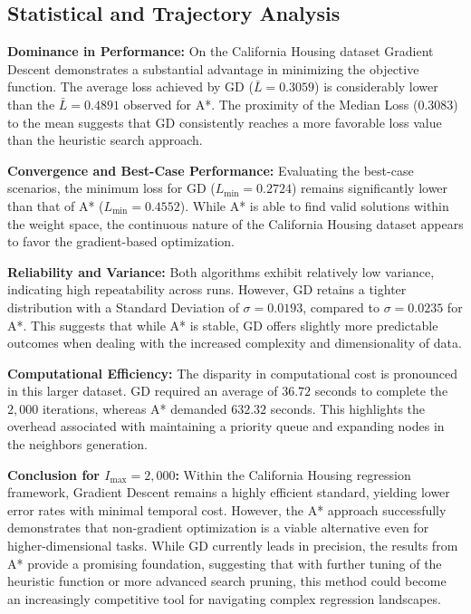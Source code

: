 \subsection*{Statistical and Trajectory Analysis}

\noindent \textbf{Dominance in Performance:} On the California Housing dataset Gradient Descent demonstrates a substantial advantage in minimizing the objective function. The average loss achieved by GD ($\bar{L} = 0.3059$) is considerably lower than the $\bar{L} = 0.4891$ observed for A*. The proximity of the Median Loss ($0.3083$) to the mean suggests that GD consistently reaches a more favorable loss value than the heuristic search approach.

\noindent \textbf{Convergence and Best-Case Performance:} Evaluating the best-case scenarios, the minimum loss for GD ($L_{\min} = 0.2724$) remains significantly lower than that of A* ($L_{\min} = 0.4552$). While A* is able to find valid solutions within the weight space, the continuous nature of the California Housing dataset appears to favor the gradient-based optimization.

\noindent \textbf{Reliability and Variance:} Both algorithms exhibit relatively low variance, indicating high repeatability across runs. However, GD retains a tighter distribution with a Standard Deviation of $\sigma = 0.0193$, compared to $\sigma = 0.0235$ for A*. This suggests that while A* is stable, GD offers slightly more predictable outcomes when dealing with the increased complexity and dimensionality of data.

\noindent \textbf{Computational Efficiency:} The disparity in computational cost is pronounced in this larger dataset. GD required an average of $36.72$ seconds to complete the $2,000$ iterations, whereas A* demanded $632.32$ seconds. This highlights the overhead associated with maintaining a priority queue and expanding nodes in the neighbors generation.

\noindent \textbf{Conclusion for $I_{\text{max}}=2,000$:} Within the California Housing regression framework, Gradient Descent remains a highly efficient standard, yielding lower error rates with minimal temporal cost. However, the A* approach successfully demonstrates that non-gradient optimization is a viable alternative even for higher-dimensional tasks. While GD currently leads in precision, the results from A* provide a promising foundation, suggesting that with further tuning of the heuristic function or more advanced search pruning, this method could become an increasingly competitive tool for navigating complex regression landscapes.


